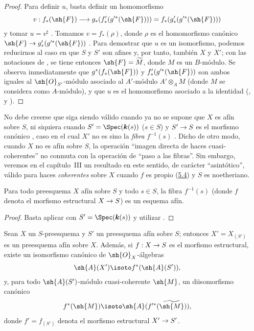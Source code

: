 \documentclass[oneside,10pt]{amsart}
\makeatletter
\newcommand{\ega@arrow}[2]{\mathchoice{#1}{#2}{#2}{#2}}
\renewcommand{\to}{\ega@arrow{\longrightarrow}{\rightarrow}}
\newcommand{\oldpage}[2][]{\marginnote{\normalfont\footnotesize\textbf{#1}~|~#2}\ignorespaces}
\let\EGAOriginalLabel\label
\renewcommand{\label}[1]{\phantomsection\EGAOriginalLabel{#1}}
\makeatother
\begin{document}
\begin{proof}
Para definir $u$, basta definir un homomorfismo
\[
  v:f_*(\sh{F})\longrightarrow
  g_*(f'_*(g^{\prime*}(\sh{F})))
  =f_*(g'_*(g^{\prime*}(\sh{F})))
\]
y tomar $u=v^\sharp$ .
Tomamos $v=f_*(\rho)$, donde $\rho$ es el homomorfismo canónico $\sh{F}\to g'_*(g^{\prime*}(\sh{F}))$ .
Para demostrar que $u$ es un isomorfismo, podemos reducirnos al caso en que $S$ y $S'$ son afines y, por tanto, también $X$ y $X'$; con las notaciones de , se tiene entonces $\sh{F}=\widetilde{M}$, donde $M$ es un $B$-módulo.
Se observa inmediatamente que $g^*(f_*(\sh{F}))$ y $f'_*(g^{\prime*}(\sh{F}))$ son ambos iguales al $\sh{O}_{S'}$-módulo asociado al $A'$-módulo $A'\otimes_A M$ (donde $M$ se considera como $A$-módulo), y que $u$ es el homomorfismo asociado a la identidad (,  y ).
\end{proof}

\begin{remark}[1.5.3]
\label{II.1.5.3}
No debe creerse que  siga siendo válido cuando ya no se supone que $X$ es afín sobre $S$, ni siquiera cuando $S'=\Spec(\boldsymbol{k}(s))$ ($s\in S$) y $S'\to S$ es el morfismo canónico , caso en el cual $X'$ no es sino la \emph{fibra $f^{-1}(s)$} .
Dicho de otro modo, cuando $X$ no es afín sobre $S$, la operación
\oldpage[II]{13}
``imagen directa de haces cuasi-coherentes'' no conmuta con la operación de ``paso a las fibras''.
Sin embargo, veremos en el capítulo~III  un resultado en este sentido, de carácter ``asintótico'', válido para haces \emph{coherentes} sobre $X$ cuando $f$ es propio (\hyperref[subsection:II.5.4]{5.4}) y $S$ es noetheriano.
\end{remark}

\begin{corollary}[1.5.4]
\label{II.1.5.4}
Para todo preesquema $X$ afín sobre $S$ y todo $s\in S$, la fibra $f^{-1}(s)$ (donde $f$ denota el morfismo estructural $X\to S$) es un esquema afín.
\end{corollary}

\begin{proof}
Basta aplicar  con $S'=\Spec(\boldsymbol{k}(s))$ y utilizar .
\end{proof}

\begin{corollary}[1.5.5]
\label{II.1.5.5}
Sean $X$ un $S$-preesquema y $S'$ un preesquema afín sobre $S$; entonces $X'=X_{(S')}$ es un preesquema afín sobre $X$.
Además, si $f:X\to S$ es el morfismo estructural, existe un isomorfismo canónico de $\sh{O}_X$-álgebras
\[
  \sh{A}(X')\isoto f^*(\sh{A}(S')),
\]
y, para todo $\sh{A}(S')$-módulo cuasi-coherente $\sh{M}$, un diisomorfismo canónico
\[
  f^*(\sh{M})\isoto\sh{A}(f^{\prime*}(\widetilde{\sh{M}})),
\]
donde $f'=f_{(S')}$ denota el morfismo estructural $X'\to S'$.
\end{corollary}
\end{document}

